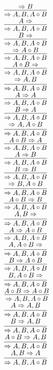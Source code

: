 \documentclass[11pt]{article}
\begin{document}
\begin{center}
\bigskip
\\$\infer{\Rightarrow A, B, A\circ B}{\Rightarrow B}$
\bigskip
\\$\infer{\Rightarrow A, B, A\circ B}{A\Rightarrow }$
\bigskip
\\$\infer{\Rightarrow A, B, A\circ B}{B\Rightarrow }$
\bigskip
\\$\infer{\Rightarrow A, B, A\circ B}{\Rightarrow A\circ B}$
\bigskip
\\$\infer{\Rightarrow A, B, A\circ B}{A\circ B\Rightarrow }$
\bigskip
\\$\infer{\Rightarrow A, B, A\circ B}{\Rightarrow A, B}$
\bigskip
\\$\infer{\Rightarrow A, B, A\circ B}{A\Rightarrow A}$
\bigskip
\\$\infer{\Rightarrow A, B, A\circ B}{B\Rightarrow A}$
\bigskip
\\$\infer{\Rightarrow A, B, A\circ B}{\Rightarrow A, A\circ B}$
\bigskip
\\$\infer{\Rightarrow A, B, A\circ B}{A\circ B\Rightarrow A}$
\bigskip
\\$\infer{\Rightarrow A, B, A\circ B}{A\Rightarrow B}$
\bigskip
\\$\infer{\Rightarrow A, B, A\circ B}{B\Rightarrow B}$
\bigskip
\\$\infer{\Rightarrow A, B, A\circ B}{\Rightarrow B, A\circ B}$
\bigskip
\\$\infer{\Rightarrow A, B, A\circ B}{A\circ B\Rightarrow B}$
\bigskip
\\$\infer{\Rightarrow A, B, A\circ B}{A, B\Rightarrow }$
\bigskip
\\$\infer{\Rightarrow A, B, A\circ B}{A\Rightarrow A\circ B}$
\bigskip
\\$\infer{\Rightarrow A, B, A\circ B}{A, A\circ B\Rightarrow }$
\bigskip
\\$\infer{\Rightarrow A, B, A\circ B}{B\Rightarrow A\circ B}$
\bigskip
\\$\infer{\Rightarrow A, B, A\circ B}{B, A\circ B\Rightarrow }$
\bigskip
\\$\infer{\Rightarrow A, B, A\circ B}{A\circ B\Rightarrow A\circ B}$
\bigskip
\\$\infer{\Rightarrow A, B, A\circ B}{A\Rightarrow A, B}$
\bigskip
\\$\infer{\Rightarrow A, B, A\circ B}{B\Rightarrow A, B}$
\bigskip
\\$\infer{\Rightarrow A, B, A\circ B}{A\circ B\Rightarrow A, B}$
\bigskip
\\$\infer{\Rightarrow A, B, A\circ B}{A, B\Rightarrow A}$

\end{center}
\end{document}

